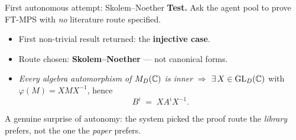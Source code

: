\documentclass[aspectratio=169,10pt]{beamer}
\begin{document}
\begin{frame}{First autonomous attempt: Skolem--Noether}
    \textbf{Test.} Ask the agent pool to prove FT-MPS with \emph{no} literature route specified.
    \vspace{0.4em}
    \begin{itemize}
        \item First non-trivial result returned: the \textbf{injective case}.
        \item Route chosen: \textbf{Skolem--Noether} --- not canonical forms.
        \item \emph{Every algebra automorphism of $M_D(\mathbb{C})$ is inner} $\Rightarrow$ $\exists\, X \in \mathrm{GL}_D(\mathbb{C})$ with $\varphi(M) = X M X^{-1}$, hence
            \[ B^i \;=\; X A^i X^{-1}. \]
    \end{itemize}
    \vspace{0.4em}
    \textcolor{dimwhite}{\footnotesize \community{} A genuine surprise of autonomy: the system picked the proof route the \emph{library} prefers, not the one the \emph{paper} prefers.}
\end{frame}
\end{document}
